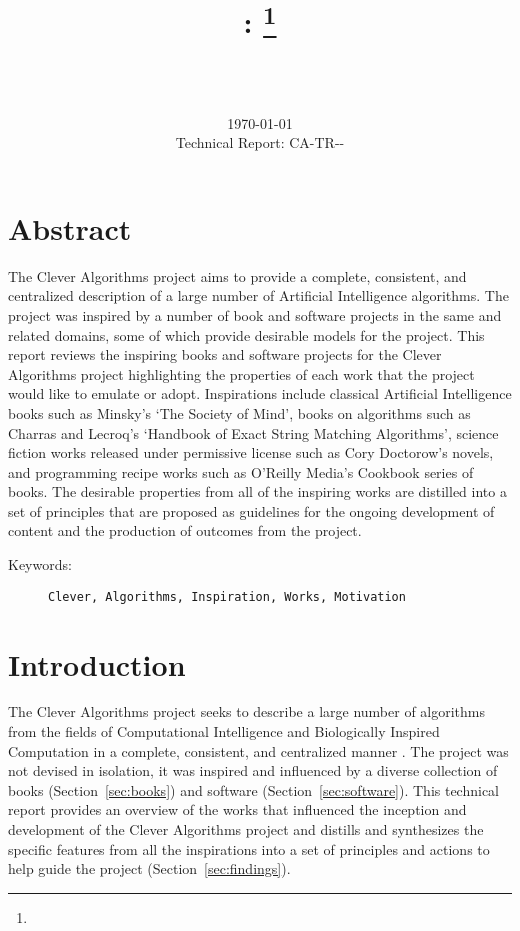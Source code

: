 \documentclass[a4paper, 11pt]{article}
\title{{\myreporttitle}: {\myreportsubtitle}\footnote{\myreportlicense}}
\author{\myreportauthor\\{\myreportemail}\\\small\myreportproject}
\date{\today\\{\small{Technical Report: CA-TR-{\myreportdate}-\myreportversion}}}
\begin{document}
\maketitle

\section*{Abstract} 
The Clever Algorithms project aims to provide a complete, consistent, and centralized description of a large number of Artificial Intelligence algorithms.
The project was inspired by a number of book and software projects in the same and related domains, some of which provide desirable models for the project. This report reviews the inspiring books and software projects for the Clever Algorithms project highlighting the properties of each work that the project would like to emulate or adopt.
Inspirations include classical Artificial Intelligence books such as Minsky's `The Society of Mind', books on algorithms such as Charras and Lecroq's `Handbook of Exact String Matching Algorithms', science fiction works released under permissive license such as Cory Doctorow's novels, and programming recipe works such as O'Reilly Media's Cookbook series of books. 
The desirable properties from all of the inspiring works are distilled into a set of principles that are proposed as guidelines for the ongoing development of content and the production of outcomes from the project.

\begin{description}
	\item[Keywords:] {\small\texttt{Clever, Algorithms, Inspiration, Works, Motivation}}
\end{description} 

\section{Introduction}
\label{sec:introduction}
The Clever Algorithms project seeks to describe a large number of algorithms from the fields of Computational Intelligence and Biologically Inspired Computation in a complete, consistent, and centralized manner \cite{Brownlee2010}. The project was not devised in isolation, it was inspired and influenced by a diverse collection of books (Section~\ref{sec:books}) and software (Section~\ref{sec:software}). This technical report provides an overview of the works that influenced the inception and development of the Clever Algorithms project and distills and synthesizes the specific features from all the inspirations into a set of principles and actions to help guide the project (Section~\ref{sec:findings}).
\end{document}
